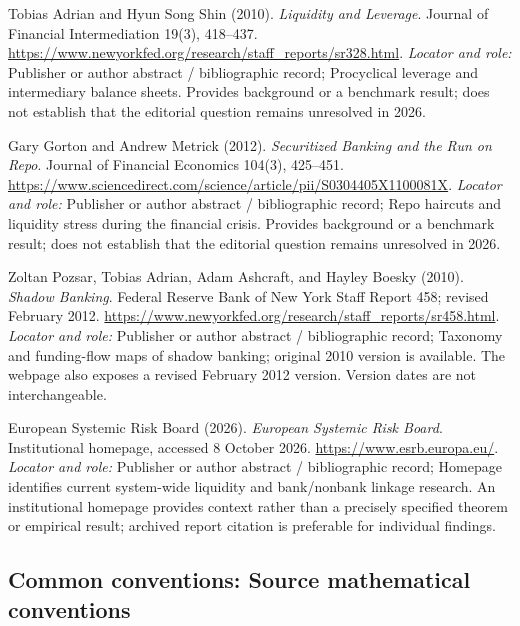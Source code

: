 \documentclass[11pt,a4paper]{article}
\begin{document}
\begin{enumerate}[label={[S\arabic*]},leftmargin=*]

\item Tobias Adrian and Hyun Song Shin (2010). \emph{Liquidity and Leverage}. Journal of Financial Intermediation 19(3), 418–437. \url{https://www.newyorkfed.org/research/staff_reports/sr328.html}.
\textit{Locator and role:} Publisher or author abstract / bibliographic record; Procyclical leverage and intermediary balance sheets. Provides background or a benchmark result; does not establish that the editorial question remains unresolved in 2026.

\item Gary Gorton and Andrew Metrick (2012). \emph{Securitized Banking and the Run on Repo}. Journal of Financial Economics 104(3), 425–451. \url{https://www.sciencedirect.com/science/article/pii/S0304405X1100081X}.
\textit{Locator and role:} Publisher or author abstract / bibliographic record; Repo haircuts and liquidity stress during the financial crisis. Provides background or a benchmark result; does not establish that the editorial question remains unresolved in 2026.

\item Zoltan Pozsar, Tobias Adrian, Adam Ashcraft, and Hayley Boesky (2010). \emph{Shadow Banking}. Federal Reserve Bank of New York Staff Report 458; revised February 2012. \url{https://www.newyorkfed.org/research/staff_reports/sr458.html}.
\textit{Locator and role:} Publisher or author abstract / bibliographic record; Taxonomy and funding-flow maps of shadow banking; original 2010 version is available. The webpage also exposes a revised February 2012 version. Version dates are not interchangeable.

\item European Systemic Risk Board (2026). \emph{European Systemic Risk Board}. Institutional homepage, accessed 8 October 2026. \url{https://www.esrb.europa.eu/}.
\textit{Locator and role:} Publisher or author abstract / bibliographic record; Homepage identifies current system-wide liquidity and bank/nonbank linkage research. An institutional homepage provides context rather than a precisely specified theorem or empirical result; archived report citation is preferable for individual findings.

\end{enumerate}

\subsection*{Common conventions: Source mathematical conventions}
\end{document}
